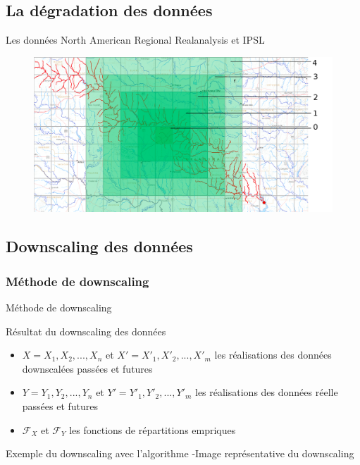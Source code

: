 \documentclass{beamer}
\numberwithin{equation}{section}
\begin{document}
	\subsection{La dégradation des données}
	\begin{frame}{Les données North American Regional Realanalysis et IPSL}
		\begin{figure}[H]
			\begin{center}
				\includegraphics[scale=0.2]{Little_Washita_deg.png}
			\end{center}
			\label{fig-Little-Washita-deg}
		\end{figure}
	\end{frame}
	\subsection{Downscaling des données}
	
	\subsubsection{Méthode de downscaling}
	\begin{frame}{Méthode de downscaling}
		\begin{minipage}[b]{0.5\linewidth}
			\begin{block}{Résultat du downscaling des données}
				\begin{itemize}
					\item $X=X_1,X_2,...,X_n$ et $X'=X'_1,X'_2,...,X'_m$ les réalisations des données downscalées passées et futures
					\item $Y=Y_1,Y_2,...,Y_n$ et $Y'=Y'_1,Y'_2,...,Y'_m$ les réalisations des données réelle passées et futures
					\item $\mathcal{F}_{X}$ et $\mathcal{F}_{Y}$ les fonctions de répartitions empriques 
				\end{itemize} 
			\end{block}
		\end{minipage}\hfill
		\begin{minipage}[b]{0.4\linewidth}
			\begin{block}{Exemple du downscaling avec l'algorithme }
				-Image représentative du downscaling
			\end{block}
		\end{minipage}
	\end{frame}
\end{document}
